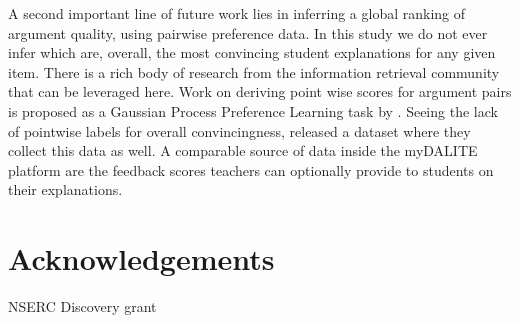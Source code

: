 \documentclass[runningheads]{llncs}
\begin{document}
A second important line of future work lies in inferring a global ranking of 
argument quality, using pairwise preference data.
In this study we do not ever infer which are, overall, the most convincing 
student explanations for any given item. 
There is a rich body of research from the information retrieval 
community~\cite{chen_pairwise_2013} that can be leveraged here. 
Work on deriving point wise scores for argument pairs is proposed as a Gaussian 
Process Preference Learning task by \cite{simpson_finding_2018}. 
Seeing the lack of pointwise labels for overall convincingness, 
\cite{toledo_automatic_2019} released a dataset where they 
collect this data as well. 
A comparable source of data inside the myDALITE platform are the feedback 
scores teachers can optionally provide to students on their explanations.

\section{Acknowledgements}
NSERC Discovery grant

 
 
\end{document}
